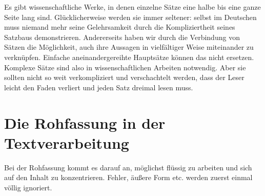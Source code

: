 \documentclass[]{book}
\theoremstyle{definition}
\theoremstyle{definition}
\theoremstyle{definition}
\theoremstyle{remark}
\begin{document}
Es gibt wissenschaftliche Werke, in denen einzelne Sätze eine halbe bis
eine ganze Seite lang sind. Glücklicherweise werden sie immer seltener:
selbst im Deutschen muss niemand mehr seine Gelehrsamkeit durch die
Kompliziertheit seines Satzbaus demonstrieren. Andererseits haben wir
durch die Verbindung von Sätzen die Möglichkeit, auch ihre Aussagen in
vielfältiger Weise miteinander zu verknüpfen. Einfache
aneinandergereihte Hauptsätze können das nicht ersetzen. Komplexe Sätze
sind also in wissenschaftlichen Arbeiten notwendig. Aber sie sollten
nicht so weit verkompliziert und verschachtelt werden, dass der Leser
leicht den Faden verliert und jeden Satz dreimal lesen muss.

\section{Die Rohfassung in der
Textverarbeitung}\label{die-rohfassung-in-der-textverarbeitung}

Bei der Rohfassung kommt es darauf an, möglichst flüssig zu arbeiten und
sich auf den Inhalt zu konzentrieren. Fehler, äußere Form etc. werden
zuerst einmal völlig ignoriert.
\end{document}
